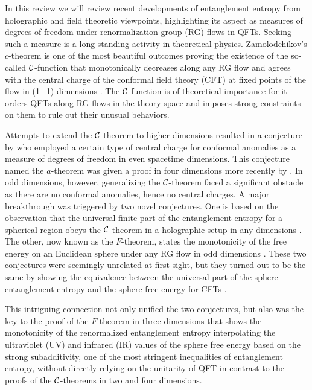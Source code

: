 In this review we will review recent developments of entanglement entropy from holographic and field theoretic viewpoints, highlighting its aspect as measures of degrees of freedom under renormalization group (RG) flows in QFTs.
Seeking such a measure is a long-standing activity in theoretical physics. Zamolodchikov's $c$-theorem is one of the most beautiful outcomes proving the existence of the so-called ${\cal C}$-function that monotonically decreases along any RG flow and agrees with the central charge of the conformal field theory (CFT) at fixed points of the flow in (1+1) dimensions \cite{Zamolodchikov:1986gt}.
The ${\cal C}$-function is of theoretical importance for it orders QFTs along RG flows in the theory space and imposes strong constraints on them to rule out their unusual behaviors.

Attempts to extend the ${\cal C}$-theorem to higher dimensions resulted in a conjecture by \textcite{Cardy:1988cwa} who employed a certain type of central charge for conformal anomalies as a measure of degrees of freedom in even spacetime dimensions.
This conjecture named the $a$-theorem was given a proof in four dimensions more recently by \textcite{Komargodski:2011vj}.
In odd dimensions, however, generalizing the ${\cal C}$-theorem faced a significant obstacle as there are no conformal anomalies, hence no central charges.
A major breakthrough was triggered by two novel conjectures.
One is based on the observation that the universal finite part of the entanglement entropy for a spherical region obeys the ${\cal C}$-theorem in a holographic setup in any dimensions \cite{Myers:2010xs,Myers:2010tj}.
The other, now known as the $F$-theorem, states the monotonicity of the free energy on an Euclidean sphere under any RG flow in odd dimensions \cite{Jafferis:2011zi,Klebanov:2011gs}.
These two conjectures were seemingly unrelated at first sight, but they turned out to be the same by showing the equivalence between the universal part of the sphere entanglement entropy and the sphere free energy for CFTs \cite{Casini:2011kv}.

This intriguing connection not only unified the two conjectures, but also was the key to the proof of the $F$-theorem in three dimensions \cite{Casini:2012ei} that shows the monotonicity of the renormalized entanglement entropy interpolating the ultraviolet (UV) and infrared (IR) values of the sphere free energy \cite{Liu:2012eea} based on the strong subadditivity, one of the most stringent inequalities of entanglement entropy, without directly relying on the unitarity of QFT in contrast to the proofs of the ${\cal C}$-theorems in two and four dimensions.

